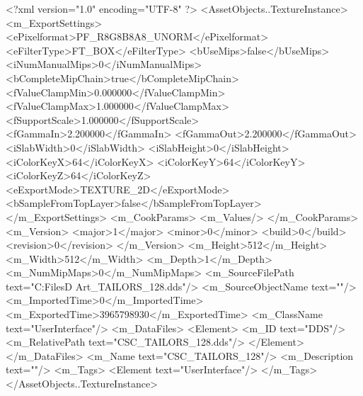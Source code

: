 <?xml version="1.0" encoding="UTF-8" ?>
<AssetObjects..TextureInstance>
	<m_ExportSettings>
		<ePixelformat>PF_R8G8B8A8_UNORM</ePixelformat>
		<eFilterType>FT_BOX</eFilterType>
		<bUseMips>false</bUseMips>
		<iNumManualMips>0</iNumManualMips>
		<bCompleteMipChain>true</bCompleteMipChain>
		<fValueClampMin>0.000000</fValueClampMin>
		<fValueClampMax>1.000000</fValueClampMax>
		<fSupportScale>1.000000</fSupportScale>
		<fGammaIn>2.200000</fGammaIn>
		<fGammaOut>2.200000</fGammaOut>
		<iSlabWidth>0</iSlabWidth>
		<iSlabHeight>0</iSlabHeight>
		<iColorKeyX>64</iColorKeyX>
		<iColorKeyY>64</iColorKeyY>
		<iColorKeyZ>64</iColorKeyZ>
		<eExportMode>TEXTURE_2D</eExportMode>
		<bSampleFromTopLayer>false</bSampleFromTopLayer>
	</m_ExportSettings>
	<m_CookParams>
		<m_Values/>
	</m_CookParams>
	<m_Version>
		<major>1</major>
		<minor>0</minor>
		<build>0</build>
		<revision>0</revision>
	</m_Version>
	<m_Height>512</m_Height>
	<m_Width>512</m_Width>
	<m_Depth>1</m_Depth>
	<m_NumMipMaps>0</m_NumMipMaps>
	<m_SourceFilePath text="C:\Users\Shadow\Desktop\Working Files\2D Art\Quarters\Tailors\CSC_TAILORS_128.dds"/>
	<m_SourceObjectName text=""/>
	<m_ImportedTime>0</m_ImportedTime>
	<m_ExportedTime>3965798930</m_ExportedTime>
	<m_ClassName text="UserInterface"/>
	<m_DataFiles>
		<Element>
			<m_ID text="DDS"/>
			<m_RelativePath text="CSC_TAILORS_128.dds"/>
		</Element>
	</m_DataFiles>
	<m_Name text="CSC_TAILORS_128"/>
	<m_Description text=""/>
	<m_Tags>
		<Element text="UserInterface"/>
	</m_Tags>
</AssetObjects..TextureInstance>


